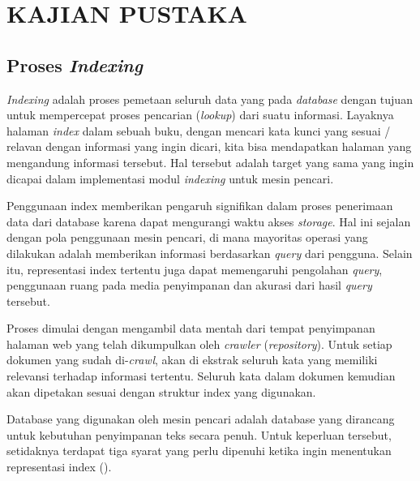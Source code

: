 
\chapter{KAJIAN PUSTAKA}

\section{Proses \emph{Indexing}}

\emph{Indexing} adalah proses pemetaan seluruh data yang pada \emph{database} 
dengan tujuan untuk mempercepat proses pencarian (\textit{lookup}) dari suatu 
informasi. Layaknya halaman \textit{index} dalam sebuah buku, dengan mencari 
kata kunci yang sesuai / relavan dengan informasi yang ingin dicari, kita bisa
mendapatkan halaman yang mengandung informasi tersebut. Hal tersebut adalah
target yang sama yang ingin dicapai dalam implementasi modul \textit{indexing} 
untuk mesin pencari.

Penggunaan index memberikan pengaruh signifikan dalam proses penerimaan data
dari database karena dapat mengurangi waktu akses \emph{storage}. Hal ini
sejalan dengan pola penggunaan mesin pencari, di mana mayoritas operasi yang
dilakukan adalah memberikan informasi berdasarkan \emph{query} dari pengguna.
Selain itu, representasi index tertentu juga dapat memengaruhi pengolahan
\emph{query}, penggunaan ruang pada media penyimpanan dan akurasi dari hasil
\emph{query} tersebut.

Proses dimulai dengan mengambil data mentah dari tempat penyimpanan halaman web
yang telah dikumpulkan oleh \emph{crawler} (\textit{repository}). Untuk setiap 
dokumen yang sudah di-\textit{crawl}, akan di ekstrak seluruh kata yang memiliki 
relevansi terhadap informasi tertentu. Seluruh kata dalam dokumen kemudian akan
dipetakan sesuai dengan struktur index yang digunakan.

Database yang digunakan oleh mesin pencari adalah database yang dirancang
untuk kebutuhan penyimpanan teks secara penuh. Untuk keperluan tersebut,
setidaknya terdapat tiga syarat yang perlu dipenuhi ketika ingin menentukan
representasi index (\cite{zobel1992efficient}).

